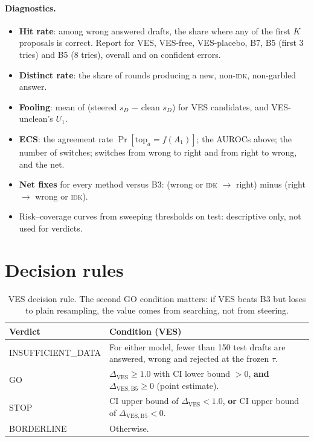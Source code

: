 \documentclass[11pt]{article}
\newcommand{\IDK}{\textsc{idk}}
\newcommand{\sD}{s_{D}}
\begin{document}
\paragraph{Diagnostics.}
\begin{itemize}
  \item \textbf{Hit rate}: among wrong answered drafts, the share where any of the first $K$ proposals is
        correct. Report for VES, VES-free, VES-placebo, B7, B5 (first 3 tries) and B5 (8 tries), overall and on
        confident errors.
  \item \textbf{Distinct rate}: the share of rounds producing a new, non-\IDK, non-garbled answer.
  \item \textbf{Fooling}: mean of (steered $\sD$ $-$ clean $\sD$) for VES candidates, and VES-unclean's
        $U_1$.
  \item \textbf{ECS}: the agreement rate $\Pr[\mathrm{top}_a = f(A_1)]$; the AUROCs above; the number of
        switches; switches from wrong to right and from right to wrong, and the net.
  \item \textbf{Net fixes} for every method versus B3: (wrong or \IDK{} $\to$ right) minus
        (right $\to$ wrong or \IDK).
  \item Risk--coverage curves from sweeping thresholds on test: descriptive only, not used for verdicts.
\end{itemize}

\section{Decision rules}\label{sec:rules}

\begin{table}[H]
\centering
\small
\begin{tabularx}{\textwidth}{@{}lL@{}}
\toprule
Verdict & Condition (VES) \\
\midrule
INSUFFICIENT\_DATA & For either model, fewer than 150 test drafts are answered, wrong and rejected at the
                     frozen $\tau$. \\
GO & $\Delta_{\mathrm{VES}} \ge 1.0$ with CI lower bound $> 0$, \textbf{and}
     $\Delta_{\mathrm{VES,B5}} \ge 0$ (point estimate). \\
STOP & CI upper bound of $\Delta_{\mathrm{VES}} < 1.0$, \textbf{or} CI upper bound of
       $\Delta_{\mathrm{VES,B5}} < 0$. \\
BORDERLINE & Otherwise. \\
\bottomrule
\end{tabularx}
\caption{VES decision rule. The second GO condition matters: if VES beats B3 but loses to plain resampling,
the value comes from searching, not from steering.}
\end{table}
\end{document}
